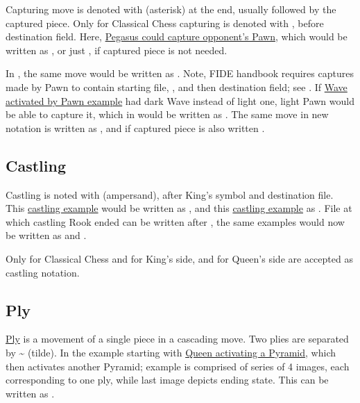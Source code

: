 Capturing move is denoted with \alg{*} (asterisk) at the end, usually followed by the captured
piece. Only for Classical Chess capturing is denoted with , before destination field.
Here, \hyperref[fig:scn_ct_04_pegasus_movement]{Pegasus could capture opponent's Pawn}, which
would be written as , or just , if captured piece is not needed.

In , the same move would be written as . Note, FIDE handbook requires
captures made by Pawn to contain starting file, , and then destination field; see
.
If \hyperref[fig:scn_mv_18_wave_activation_by_capture_pawn]{Wave activated by Pawn example} had
dark Wave instead of light one, light Pawn would be able to capture it, which in 
would be written as . The same move in new notation is written as , and
if captured piece is also written .

\subsection*{Castling}
\label{sec:Appendix/Notation/Castling}

Castling is noted with \alg{\&} (ampersand), after King's symbol and destination file. This
\hyperref[fig:age_of_aquarius_castling_left_04]{castling example} would be written as ,
and this \hyperref[fig:one_castling_right_04]{castling example} as . File at which
castling Rook ended can be written after \alg{\&}, the same examples would now be written as
 and .

Only for Classical Chess  and  for King's side,  and
 for Queen's side are accepted as castling notation.

\vfill

\subsection*{Ply}
\label{sec:Appendix/Notation/Ply}

\hyperref[sec:Terms/Ply]{Ply} is a movement of a single piece in a cascading move. Two plies
are separated by \~{} (tilde). In the example starting with
\hyperref[fig:scn_ma_15_cascading_init]{Queen activating a Pyramid}, which then activates
another Pyramid; example is comprised of series of 4 images, each corresponding to one ply,
while last image depicts ending state. This can be written as .

